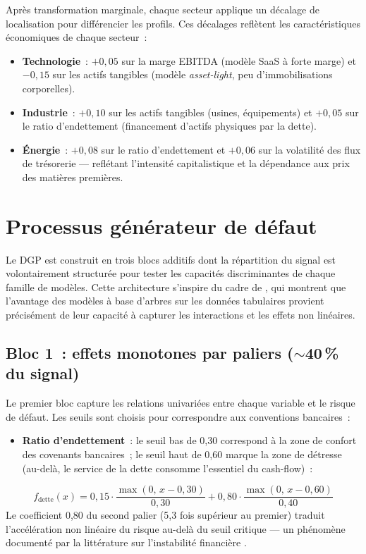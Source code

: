 \documentclass[12pt, a4paper, twoside, openright]{report}
\theoremstyle{definition}
\begin{document}
Après transformation marginale, chaque secteur applique un décalage de localisation pour différencier les profils.
Ces décalages reflètent les caractéristiques économiques de chaque secteur~:
\begin{itemize}[nosep]
  \item \textbf{Technologie}~: $+0{,}05$ sur la marge EBITDA (modèle SaaS à forte marge) et $-0{,}15$ sur les actifs tangibles (modèle \emph{asset-light}, peu d'immobilisations corporelles).
  \item \textbf{Industrie}~: $+0{,}10$ sur les actifs tangibles (usines, équipements) et $+0{,}05$ sur le ratio d'endettement (financement d'actifs physiques par la dette).
  \item \textbf{Énergie}~: $+0{,}08$ sur le ratio d'endettement et $+0{,}06$ sur la volatilité des flux de trésorerie --- reflétant l'intensité capitalistique et la dépendance aux prix des matières premières.
\end{itemize}


\section{Processus générateur de défaut}
\label{sec:donnees:dgp}

Le DGP est construit en trois blocs additifs dont la répartition du signal est volontairement structurée pour tester les capacités discriminantes de chaque famille de modèles.
Cette architecture s'inspire du cadre de \citet{grinsztajn2022}, qui montrent que l'avantage des modèles à base d'arbres sur les données tabulaires provient précisément de leur capacité à capturer les interactions et les effets non linéaires.

\subsection{Bloc 1~: effets monotones par paliers ($\sim$40\,\% du signal)}

Le premier bloc capture les relations univariées entre chaque variable et le risque de défaut.
Les seuils sont choisis pour correspondre aux conventions bancaires~:

\begin{itemize}[nosep]
  \item \textbf{Ratio d'endettement}~: le seuil bas de 0{,}30 correspond à la zone de confort des covenants bancaires~; le seuil haut de 0{,}60 marque la zone de détresse (au-delà, le service de la dette consomme l'essentiel du cash-flow)~:
\end{itemize}
%
\begin{equation}
\label{eq:bloc1_dette}
f_{\text{dette}}(x) = 0{,}15 \cdot \frac{\max(0,\, x - 0{,}30)}{0{,}30} + 0{,}80 \cdot \frac{\max(0,\, x - 0{,}60)}{0{,}40}
\end{equation}
%
Le coefficient 0{,}80 du second palier (5{,}3 fois supérieur au premier) traduit l'accélération non linéaire du risque au-delà du seuil critique --- un phénomène documenté par la littérature sur l'instabilité financière \citep{merton1974}.
\end{document}
